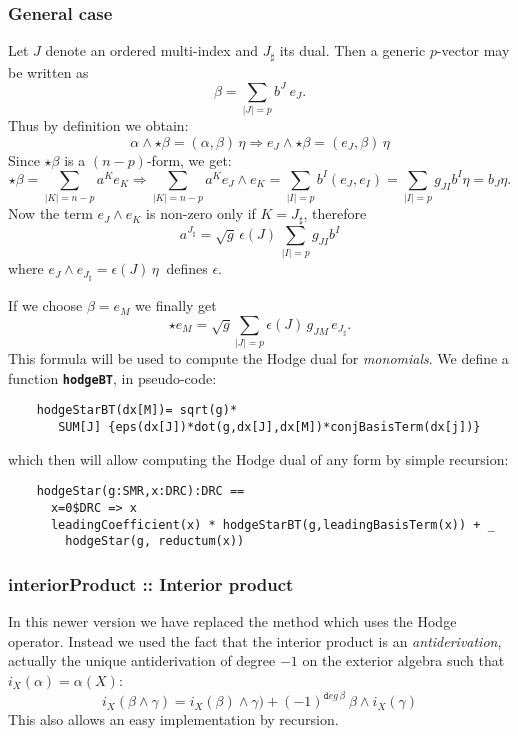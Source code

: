\documentclass[12pt,a4paper]{article}
\newcommand{\spadbold}[1]{{\tt\bf #1}}
\begin{document}
\subsubsection{General case}
Let $J$ denote an ordered multi-index and $J_\sharp$ its dual.
Then a generic $p$-vector may be written as
\begin{displaymath}
   \beta = \sum_{|J|=p} b^J \ e_J.
\end{displaymath}
Thus by definition we obtain:
\begin{displaymath}
    \alpha\wedge\star\beta=(\alpha,\beta)\,\eta \Rightarrow
    e_J\wedge\star\beta=(e_J,\beta)\,\eta
\end{displaymath}
Since $\star\beta$ is a $(n-p)$-form, we get:
\begin{displaymath}
 \star\beta=\sum_{|K|=n-p} a^K e_K \Rightarrow
   \sum_{|K|=n-p} a^K e_J\wedge e_K=\sum_{|I|=p} b^I (e_J,e_I)=
   \sum_{|I|=p} g_{JI} b^I \eta = b_J \eta. 
\end{displaymath}
Now the term $e_J\wedge e_K$ is non-zero only if $K=J_\sharp$,
therefore
\begin{displaymath}
  a^{J_\sharp} =\sqrt{g}\, \epsilon(J)\, \sum_{|I|=p} g_{JI} b^I
\end{displaymath}
where $e_J\wedge e_{J_\sharp}=\epsilon(J)\, \eta\ $ defines 
$\epsilon$.

If we choose $\beta=e_M$ we finally get
\begin{displaymath}
  \star e_M = \sqrt{g} \sum_{|J|=p} \epsilon(J)\, g_{JM}\, e_{J_\sharp}.
\end{displaymath}
This formula will be used to compute the Hodge dual for {\it monomials}. 
We define a function \spadbold{hodgeBT}, in pseudo-code:
\begin{lstlisting}
    hodgeStarBT(dx[M])= sqrt(g)* 
       SUM[J] {eps(dx[J])*dot(g,dx[J],dx[M])*conjBasisTerm(dx[j])}
\end{lstlisting}
which then will allow computing the Hodge dual of any form by simple recursion:
\begin{lstlisting}
    hodgeStar(g:SMR,x:DRC):DRC ==
      x=0$DRC => x
      leadingCoefficient(x) * hodgeStarBT(g,leadingBasisTerm(x)) + _
        hodgeStar(g, reductum(x))
\end{lstlisting}
%
\subsubsection{interiorProduct :: Interior product}
In this newer version we have replaced the method which uses the Hodge
operator. Instead we used the fact that the interior product is 
an {\it antiderivation}, actually the unique antiderivation of degree 
$-1$ on the exterior algebra such that $i_X(\alpha)=\alpha(X)$:
\begin{displaymath}
      i_X(\beta\wedge\gamma)=i_X(\beta)\wedge\gamma)+
     (-1)^{{\mathtt deg}\, \beta}\ \beta\wedge i_X(\gamma)
\end{displaymath}
This also allows an easy implementation by recursion.
%
\end{document}
